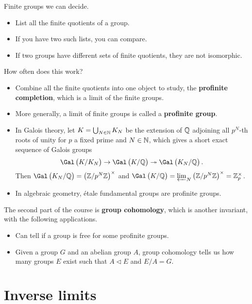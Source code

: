 Finite groups we can decide.
\begin{itemize}
\item List all the finite quotients of a group.
\item If you have two such lists, you can compare.
\item If two groups have different sets of finite quotients, they are not isomorphic.
\end{itemize}
How often does this work?
\begin{itemize}
\item Combine all the finite quotients into one object to study, the \textbf{profinite completion}, which is a limit of the finite groups.
\item More generally, a limit of finite groups is called a \textbf{profinite group}.
\end{itemize}

\begin{example*}
\hfill
\begin{itemize}
\item In Galois theory, let $ K = \bigcup_{N \in \mathbb{N}} K_N $ be the extension of $ \mathbb{Q} $ adjoining all $ p^N $-th roots of unity for $ p $ a fixed prime and $ N \in \mathbb{N} $, which gives a short exact sequence of Galois groups
$$ \Gal\br{K / K_N} \to \Gal\br{K / \QQ} \twoheadrightarrow \Gal\br{K_N / \QQ}. $$
Then $ \Gal\br{K_N / \QQ} = \br{\ZZ / p^N\ZZ}^\times $ and $ \Gal\br{K / \QQ} = \varprojlim_N \br{\ZZ / p^N\ZZ}^\times = \ZZ_p^\times $.
\item In algebraic geometry, \'etale fundamental groups are profinite groups.
\end{itemize}
\end{example*}

The second part of the course is \textbf{group cohomology}, which is another invariant, with the following applications.
\begin{itemize}
\item Can tell if a group is free for some profinite groups.
\item Given a group $ G $ and an abelian group $ A $, group cohomology tells us how many groups $ E $ exist such that $ A \triangleleft E $ and $ E / A = G $.
\end{itemize}

\pagebreak

\section{Inverse limits}

